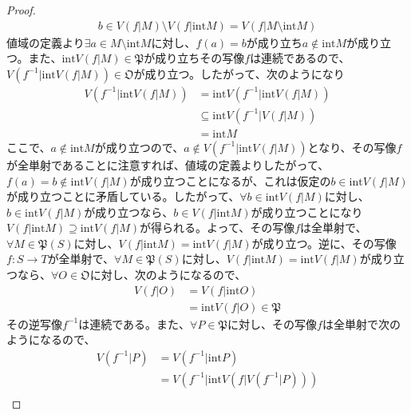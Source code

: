 \documentclass[dvipdfmx]{jsarticle}
\begin{document}
\begin{proof}
\begin{align*}
b \in V\left( f|M \right) \setminus V\left( f|{\mathrm{int}}M \right) = V\left( f|M \setminus {\mathrm{int}}M \right)
\end{align*}
値域の定義より$\exists a \in M \setminus {\mathrm{int}}M$に対し、$f(a) = b$が成り立ち$a \notin {\mathrm{int}}M$が成り立つ。また、${\mathrm{int}}{V\left( f|M \right)} \in \mathfrak{P}$が成り立ちその写像$f$は連続であるので、$V\left( f^{- 1}|{\mathrm{int}}{V\left( f|M \right)} \right) \in \mathfrak{O}$が成り立つ。したがって、次のようになり
\begin{align*}
V\left( f^{- 1}|{\mathrm{int}}{V\left( f|M \right)} \right) &= {\mathrm{int}}{V\left( f^{- 1}|{\mathrm{int}}{V\left( f|M \right)} \right)}\\
&\subseteq {\mathrm{int}}{V\left( f^{- 1}|V\left( f|M \right) \right)}\\
&= {\mathrm{int}}M
\end{align*}
ここで、$a \notin {\mathrm{int}}M$が成り立つので、$a \notin V\left( f^{- 1}|{\mathrm{int}}{V\left( f|M \right)} \right)$となり、その写像$f$が全単射であることに注意すれば、値域の定義よりしたがって、$f(a) = b \notin {\mathrm{int}}{V\left( f|M \right)}$が成り立つことになるが、これは仮定の$b \in {\mathrm{int}}{V\left( f|M \right)}$が成り立つことに矛盾している。したがって、$\forall b \in {\mathrm{int}}{V\left( f|M \right)}$に対し、$b \in {\mathrm{int}}{V\left( f|M \right)}$が成り立つなら、$b \in V\left( f|{\mathrm{int}}M \right)$が成り立つことになり$V\left( f|{\mathrm{int}}M \right) \supseteq {\mathrm{int}}{V\left( f|M \right)}$が得られる。よって、その写像$f$は全単射で、$\forall M\in \mathfrak{P}(S)$に対し、$V\left( f|{\mathrm{int}}M \right) = {\mathrm{int}}{V\left( f|M \right)}$が成り立つ。逆に、その写像$f:S \rightarrow T$が全単射で、$\forall M\in \mathfrak{P}(S)$に対し、$V\left( f|{\mathrm{int}}M \right) = {\mathrm{int}}{V\left( f|M \right)}$が成り立つなら、$\forall O \in \mathfrak{O}$に対し、次のようになるので、
\begin{align*}
V\left( f|O \right) &= V\left( f|{\mathrm{int}}O \right)\\
&= {\mathrm{int}}{V\left( f|O \right)} \in \mathfrak{P}
\end{align*}
その逆写像$f^{- 1}$は連続である。また、$\forall P \in \mathfrak{P}$に対し、その写像$f$は全単射で次のようになるので、
\begin{align*}
V\left( f^{- 1}|P \right) &= V\left( f^{- 1}|{\mathrm{int}}P \right)\\
&= V\left( f^{- 1}|{\mathrm{int}}{V\left( f|V\left( f^{- 1}|P \right) \right)} \right)\\

\end{align*}
\end{proof}
\end{document}
